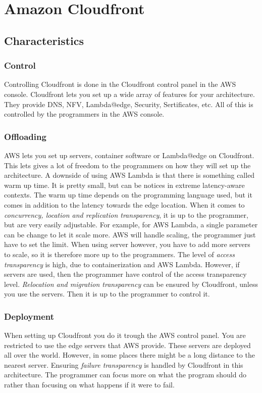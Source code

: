 






\section{Amazon Cloudfront}
\subsection{Characteristics}
\subsubsection{Control}
Controlling Cloudfront is done in the Cloudfront control panel in the AWS console. Cloudfront lets you set up a wide array of features for your architecture. They provide DNS, NFV, Lambda@edge, Security, Sertificates, etc. All of this is controlled by the programmers in the AWS console.  


\subsubsection{Offloading}
AWS lets you set up servers, container software or Lambda@edge on Cloudfront. This lets gives a lot of freedom to the programmers on how they will set up the architecture. A downside of using AWS Lambda is that there is something called warm up time. It is pretty small, but can be notices in extreme latency-aware contexts. The warm up time depends on the programming language used, but it comes in addition to the latency towards the edge location. When it comes to \textit{concurrency, location and replication transparency}, it is up to the programmer, but are very easily adjustable. For example, for AWS Lambda, a single parameter can be change to let it scale more. AWS will handle scaling, the programmer just have to set the limit. When using server however, you have to add more servers to scale, so it is therefore more up to the programmers. The level of \textit{access transparency} is high, due to containerization and AWS Lambda. However, if servers are used, then the programmer have control of the access transparency level. \textit{Relocation and migration transparency} can be ensured by Cloudfront, unless you use the servers. Then it is up to the programmer to control it. 


\subsubsection{Deployment}
When setting up Cloudfront you do it trough the AWS control panel. You are restricted to use the edge servers that AWS provide. These servers are deployed all over the world. However, in some places there might be a long distance to the nearest server. Ensuring \textit{failure transparency} is handled by Cloudfront in this architecture. The programmer can focus more on what the program should do rather than focusing on what happens if it were to fail. 




